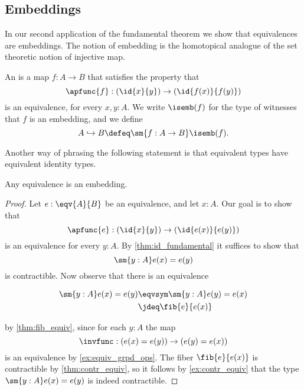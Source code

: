 \subsection{Embeddings}
In our second application of the fundamental theorem we show that equivalences are embeddings. The notion of embedding is the homotopical analogue of the set theoretic notion of injective map.

\begin{defn}
An  is a map $f:A\to B$ that satisfies the property that
\begin{equation*}
\apfunc{f}:(\id{x}{y})\to(\id{f(x)}{f(y)})
\end{equation*}
is an equivalence, for every $x,y:A$. We write $\isemb(f)$ for the type of witnesses that $f$ is an embedding, and we define
\begin{equation*}
  A\hookrightarrow B\defeq \sm{f:A\to B}\isemb(f).
\end{equation*}
\end{defn}

Another way of phrasing the following statement is that equivalent types have equivalent identity types.

\begin{thm}
\label{cor:emb_equiv} 
Any equivalence is an embedding.
\end{thm}

\begin{proof}
Let $e:\eqv{A}{B}$ be an equivalence, and let $x:A$. Our goal is to show that
\begin{equation*}
\apfunc{e} : (\id{x}{y})\to (\id{e(x)}{e(y)})
\end{equation*}
is an equivalence for every $y:A$. By \cref{thm:id_fundamental} it suffices to show that 
\begin{equation*}
\sm{y:A}e(x)=e(y)
\end{equation*}
is contractible. Now observe that there is an equivalence
\begin{samepage}
\begin{align*}
\sm{y:A}e(x)=e(y) & \eqvsym \sm{y:A}e(y)=e(x) \\
& \jdeq \fib{e}{e(x)}
\end{align*}
\end{samepage}
by \cref{thm:fib_equiv}, since for each $y:A$ the map
\begin{equation*}
\invfunc : (e(x)=e(y))\to (e(y)= e(x))
\end{equation*}
is an equivalence by \cref{ex:equiv_grpd_ops}.
The fiber $\fib{e}{e(x)}$ is contractible by \cref{thm:contr_equiv}, so it follows by \cref{ex:contr_equiv} that the type $\sm{y:A}e(x)=e(y)$ is indeed contractible.
\end{proof}

